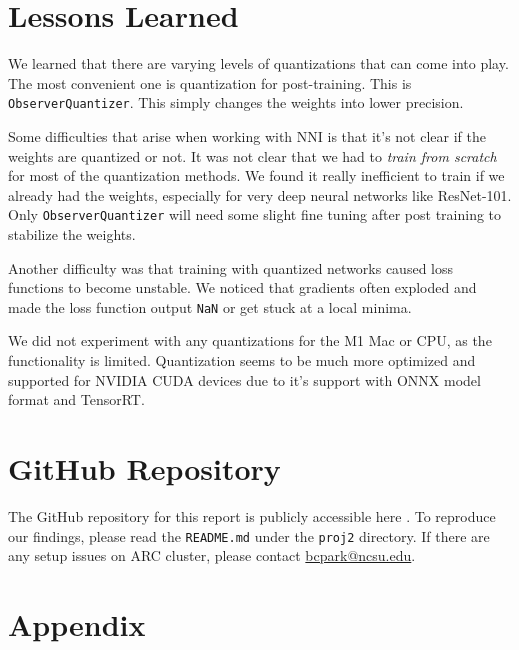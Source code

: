 \documentclass{article}
\begin{document}
\section{Lessons Learned}
We learned that there are varying levels of quantizations that can come into play. The most convenient one is quantization for post-training. This is \verb|ObserverQuantizer|. This simply changes the weights into lower precision.


Some difficulties that arise when working with NNI is that it's not clear if the weights are quantized or not. It was not clear that we had to \textit{train from scratch} for most of the quantization methods. We found it really inefficient to train if we already had the weights, especially for very deep neural networks like ResNet-101. Only \verb|ObserverQuantizer| will need some slight fine tuning after post training to stabilize the weights.

Another difficulty was that training with quantized networks caused loss functions to become unstable. We noticed that gradients often exploded and made the loss function output \verb|NaN| or get stuck at a local minima.

We did not experiment with any quantizations for the M1 Mac or CPU, as the functionality is limited. Quantization seems to be much more optimized and supported for NVIDIA CUDA devices due to it's support with ONNX model format and TensorRT.

\section{GitHub Repository}
The GitHub repository for this report is publicly accessible here \cite{proj2-repo}. To reproduce our findings, please read the \verb|README.md| under the \verb|proj2| directory. If there are any setup issues on ARC cluster, please contact \href{mailto:bcpark@ncsu.edu}{bcpark@ncsu.edu}.





\section{Appendix}
\end{document}
